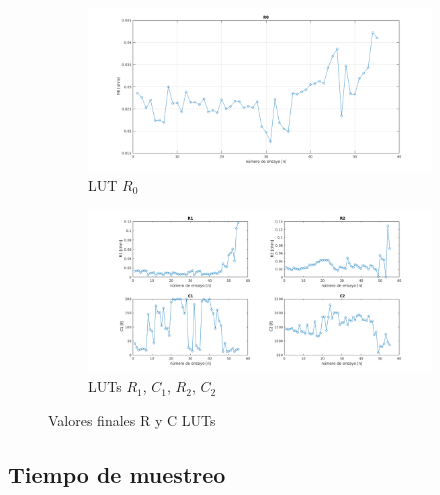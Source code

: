 \documentclass[10pt,a4paper]{article}
\begin{document}
\begin{figure}[h!]
    \begin{center}
        \begin{subfigure}{.6\textwidth}
            \includegraphics[width=1\textwidth]{R0_lutable_corrected.png}
            \caption{\acrshort{LUT} $R_0$}
            \label{fig:lut_R0}
        \end{subfigure}

        \begin{subfigure}{1\textwidth}
            \includegraphics[width=1\textwidth]{RC_lutables_corrected.png}
            \caption{\acrshort{LUT}s $R_1$, $C_1$, $R_2$, $C_2$}
            \label{fig:lut_RCn}
        \end{subfigure}
    \end{center}
    \caption{Valores finales R y C \acrlong{LUT}s}
    \label{fig:lut_RC}
\end{figure}
\FloatBarrier

\subsection{Tiempo de muestreo}
\end{document}
